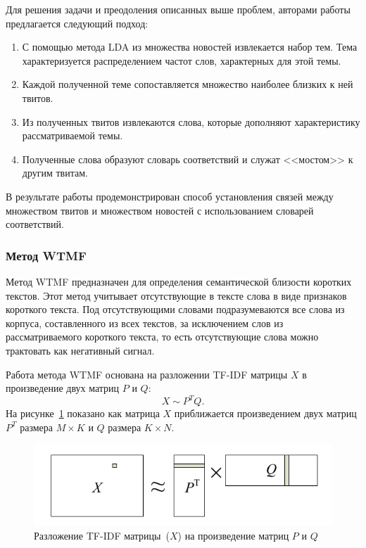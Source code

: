          Для решения задачи и преодоления описанных выше проблем, авторами работы предлагается следующий подход:
         \begin{enumerate}
            \item С помощью метода LDA из множества новостей извлекается набор тем. Тема характеризуется распределением частот слов, характерных для этой темы.
            \item Каждой полученной теме сопоставляется множество наиболее близких к ней твитов.
            \item Из полученных твитов извлекаются слова, которые дополняют характеристику рассматриваемой темы.
            \item Полученные слова образуют словарь соответствий и служат <<мостом>> к другим твитам.
         \end{enumerate}
         В результате работы продемонстрирован способ установления связей между множеством твитов и множеством новостей с использованием словарей соответствий.

    \subsubsection{Метод WTMF}
    \label{subsubsec:wtmf}
        Метод WTMF предназначен для определения семантической близости коротких текстов.
        Этот метод учитывает отсутствующие в тексте слова в виде признаков короткого текста.
        Под отсутствующими словами подразумеваются все слова из корпуса, составленного из всех текстов, за исключением слов из рассматриваемого короткого текста,
        то есть отсутствующие слова можно трактовать как негативный сигнал.

        Работа метода WTMF основана на разложении TF-IDF матрицы $X$ в произведение двух матриц $P$ и $Q$:
        $$X \sim P^TQ.$$
        На рисунке~\ref{pic:wtmf} показано как матрица $X$ приближается произведением двух матриц $P^T$ размера $M \times K$ и $Q$ размера $K \times N$.

        \begin{figure}[h!]
            \center
            \includegraphics[scale=0.45]{wtmf.png}
            \caption{Разложение TF-IDF матрицы~($X$) на произведение матриц $P$ и $Q$}
            \label{pic:wtmf}
        \end{figure}

